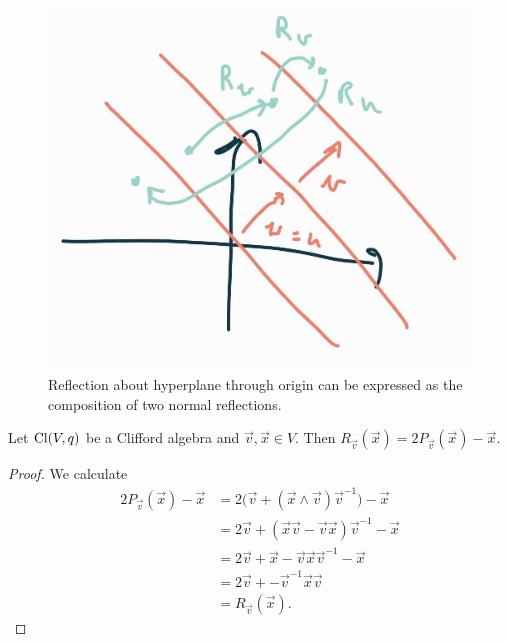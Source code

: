 \begin{figure}[h!]
\centering
\includegraphics[width=.8\textwidth]{reflectionAboutHyperplaneThroughOrigin}
\caption{Reflection about hyperplane through origin can be expressed as the composition of two normal reflections.}
\end{figure}


\begin{lemma}
Let $\operatorname{Cl}(V,q)$ be a Clifford algebra and $\vec{v}, \vec{x}\in V$. Then $R_{\vec{v}}(\vec{x}) = 2 P_{\vec{v}}(\vec{x}) - \vec{x}$.
\end{lemma}
\begin{proof}
We calculate
\begin{align*}
2 P_{\vec{v}}(\vec{x}) - \vec{x} &= 2 \big(\vec{v}+ (\vec{x}\wedge \vec{v})\vec{v}^{-1}\big) - \vec{x} \\
&= 2\vec{v}+ (\vec{x}\vec{v}- \vec{v}\vec{x})\vec{v}^{-1} - \vec{x} \\
&= 2\vec{v}+ \vec{x}- \vec{v}\vec{x}\vec{v}^{-1} - \vec{x} \\
&= 2\vec{v}+ - \vec{v}^{-1}\vec{x}\vec{v} \\
&= R_{\vec{v}}(\vec{x}).
\end{align*}
\end{proof}

